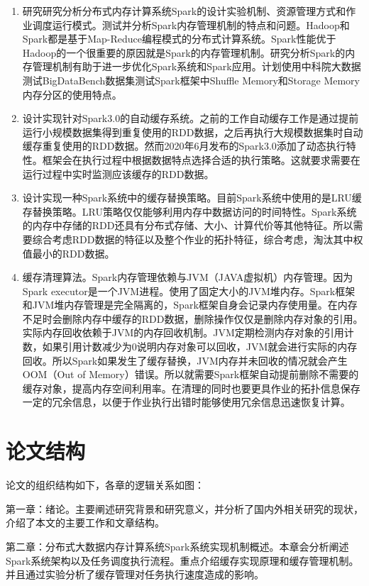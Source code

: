 \begin{enumerate}
    \item 研究研究分析分布式内存计算系统Spark的设计实验机制、资源管理方式和作业调度运行模式。测试并分析Spark内存管理机制的特点和问题。Hadoop和Spark都是基于Map-Reduce编程模式的分布式计算系统。Spark性能优于Hadoop的一个很重要的原因就是Spark的内存管理机制。研究分析Spark的内存管理机制有助于进一步优化Spark系统和Spark应用。计划使用中科院大数据测试BigDataBench数据集测试Spark框架中Shuffle Memory和Storage Memory内存分区的使用特点。
    \item 设计实现针对Spark3.0的自动缓存系统。之前的工作自动缓存工作是通过提前运行小规模数据集得到重复使用的RDD数据，之后再执行大规模数据集时自动缓存重复使用的RDD数据。然而2020年6月发布的Spark3.0添加了动态执行特性。框架会在执行过程中根据数据特点选择合适的执行策略。这就要求需要在运行过程中实时监测应该缓存的RDD数据。
    \item 设计实现一种Spark系统中的缓存替换策略。目前Spark系统中使用的是LRU缓存替换策略。LRU策略仅仅能够利用内存中数据访问的时间特性。Spark系统的内存中存储的RDD还具有分布式存储、大小、计算代价等其他特征。所以需要综合考虑RDD数据的特征以及整个作业的拓扑特征，综合考虑，淘汰其中权值最小的RDD数据。
    \item 缓存清理算法。Spark内存管理依赖与JVM（JAVA虚拟机）内存管理。因为Spark executor是一个JVM进程。使用了固定大小的JVM堆内存。Spark框架和JVM堆内存管理是完全隔离的，Spark框架自身会记录内存使用量。在内存不足时会删除内存中缓存的RDD数据，删除操作仅仅是删除内存对象的引用。实际内存回收依赖于JVM的内存回收机制。JVM定期检测内存对象的引用计数，如果引用计数减少为0说明内存对象可以回收，JVM就会进行实际的内存回收。所以Spark如果发生了缓存替换，JVM内存并未回收的情况就会产生OOM（Out of Memory）错误。所以就需要Spark框架自动提前删除不需要的缓存对象，提高内存空间利用率。在清理的同时也要更具作业的拓扑信息保存一定的冗余信息，以便于作业执行出错时能够使用冗余信息迅速恢复计算。
\end{enumerate}

\section{论文结构}

论文的组织结构如下，各章的逻辑关系如图：

第一章：绪论。主要阐述研究背景和研究意义，并分析了国内外相关研究的现状，介绍了本文的主要工作和文章结构。

第二章：分布式大数据内存计算系统Spark系统实现机制概述。本章会分析阐述Spark系统架构以及任务调度执行流程。重点介绍缓存实现原理和缓存管理机制。并且通过实验分析了缓存管理对任务执行速度造成的影响。

